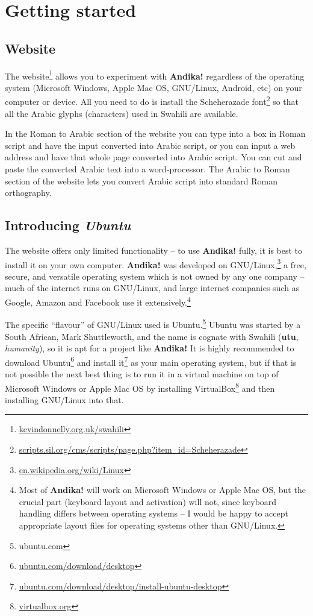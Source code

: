 \chapter{Getting started}
\label{ch:started}

\section{Website}

The website\footnote{\url{kevindonnelly.org.uk/swahili}} allows you to experiment with \textbf{Andika!} regardless of the operating system (Microsoft Windows, Apple Mac OS, GNU/Linux, Android, etc) on your computer or device.  All you need to do is install the Scheherazade font\footnote{\url{scripts.sil.org/cms/scripts/page.php?item_id=Scheherazade}} so that all the Arabic glyphs (characters) used in Swahili are available.

In the Roman to Arabic section of the website you can type into a box in Roman script and have the input converted into Arabic script, or you can input a web address and have that whole page converted into Arabic script.  You can cut and paste the converted Arabic text into a word-processor.  The Arabic to Roman section of the website lets you convert Arabic script into standard Roman orthography.

\section{Introducing \textit{Ubuntu}}

The website offers only limited functionality -- to use \textbf{Andika!} fully, it is best to install it on your own computer.  \textbf{Andika!} was developed on GNU/Linux,\footnote{\url{en.wikipedia.org/wiki/Linux}} a free, secure, and versatile operating system which is not owned by any one company -- much of the internet runs on GNU/Linux, and large internet companies such as Google, Amazon and Facebook use it extensively.\footnote{Most of \textbf{Andika!} will work on Microsoft Windows or Apple Mac OS, but the crucial part (keyboard layout and activation) will not, since keyboard handling differs between operating systems -- I would be happy to accept appropriate layout files for operating systems other than GNU/Linux.}

The specific ``flavour'' of GNU/Linux used is Ubuntu.\footnote{ubuntu.com}  Ubuntu was started by a South African, Mark Shuttleworth, and the name is cognate with Swahili  (\textbf{utu}, \textit{humanity}), so it is apt for a project like \textbf{Andika!}  It is highly recommended to download Ubuntu\footnote{\url{ubuntu.com/download/desktop}} and install it\footnote{\url{ubuntu.com/download/desktop/install-ubuntu-desktop}} as your main operating system, but if that is not possible the next best thing is to run it in a virtual machine on top of Microsoft Windows or Apple Mac OS by installing VirtualBox\footnote{\url{virtualbox.org}} and then installing GNU/Linux into that.

